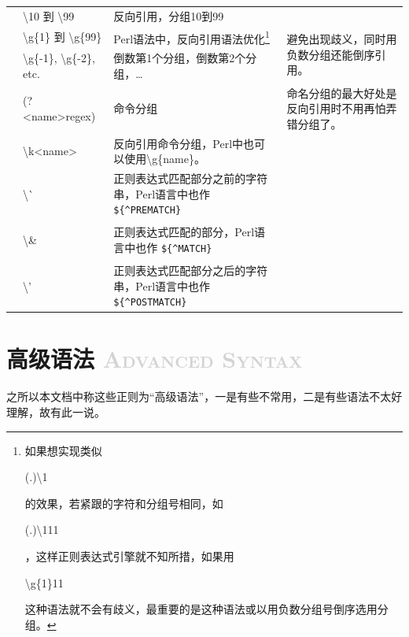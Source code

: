 \documentclass[12pt,a4paper,twoside]{ctexart}
\newcommand{\cbregex}[1]{\colorbox{orange!18}{\strut #1}}
\begin{document}
\begin{center}
\begin{longtable}{p{4em}p{8em}p{25em}p{18em}}
  & \textbackslash{}10 到 \textbackslash{}99 & 反向引用，分组10到99 & \\
  & \textbackslash{}g\{1\} 到 \textbackslash{}g\{99\} & Perl语法中，反向引用语法优化\footnote{如果想实现类似\cbregex{(.)\textbackslash{}1}的效果，若紧跟的字符和分组号相同，如\cbregex{(.)\textbackslash{}111}，这样正则表达式引擎就不知所措，如果用\cbregex{\textbackslash{}g\{1\}11}这种语法就不会有歧义，最重要的是这种语法或以用负数分组号倒序选用分组。} & \multirow{2}{18em}{避免出现歧义，同时用负数分组还能倒序引用。} \\
  & \textbackslash{}g\{-1\}, \textbackslash{}g\{-2\}, etc. & 倒数第1个分组，倒数第2个分组，\ldots & \\
  & (?<name>regex) & 命令分组 & 命名分组的最大好处是反向引用时不用再怕弄错分组了。 \\
  & \textbackslash{}k<name> & 反向引用命令分组，Perl中也可以使用\textbackslash{}g\{name\}。 & \\
  & \cbregex{\textbackslash{}\`{}} & 正则表达式匹配部分之前的字符串，Perl语言中也作 \verb=${^PREMATCH}= & \\
  & \cbregex{\textbackslash{}\&} & 正则表达式匹配的部分，Perl语言中也作 \verb=${^MATCH}= & \\
  & \cbregex{\textbackslash{}'} & 正则表达式匹配部分之后的字符串，Perl语言中也作 \verb=${^POSTMATCH}= & \\
\end{longtable}
\end{center}

\section[高级语法]{高级语法 \textcolor{lightgray}{\textsc{Advanced Syntax}}}
\label{sec:adv-syntax}

之所以本文档中称这些正则为“高级语法”，一是有些不常用，二是有些语法不太好理解，故有此一说。

\end{document}
